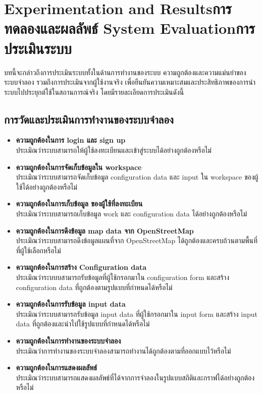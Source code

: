 \chapter{\ifproject%
\ifenglish Experimentation and Results\else การทดลองและผลลัพธ์\fi
\else%
\ifenglish System Evaluation\else การประเมินระบบ\fi
\fi}
\begin{mypara}
    \indent บทนี้จะกล่าวถึงการประเมินระบบทั้งในด้านการทำงานของระบบ ความถูกต้องและความแม่นยำของระบบจำลอง 
    รวมถึงการประเมินจากผู้ใช้งานจริง เพื่อยืนยันความเหมาะสมและประสิทธิภาพของการนำระบบไปประยุกต์ใช้ในสถานการณ์จริง
    โดยมีรายละเอียดการประเมินดังนี้
\end{mypara}

\section{การวัดและประเมินการทำงานของระบบจำลอง}
\begin{itemize}
    \item \textbf{ความถูกต้องในการ login และ sign up}
        \\ ประเมิณว่าระบบสามารถให้ผู้ใช้ลงทะเบียนและเข้าสู่ระบบได้อย่างถูกต้องหรือไม่
    \item \textbf{ความถูกต้องในการจัดเก็บข้อมูลใน workspace}
        \\ ประเมิณว่าระบบสามารถจัดเก็บข้อมูล configuration data และ input ใน workspace ของผู้ใช้ได้อย่างถูกต้องหรือไม่
    \item \textbf{ความถูกต้องในการเก็บข้อมูล ของผู้ใช้ที่ลงทะเบียน}
        \\ ประเมิณว่าระบบสามารถเก็บข้อมูล work และ configuration data ได้อย่างถูกต้องหรือไม่
    \item \textbf{ความถูกต้องในการดึงข้อมูล map data จาก OpenStreetMap}
        \\ ประเมิณว่าระบบสามารถดึงข้อมูลแผนที่จาก OpenStreetMap ได้ถูกต้องและครบถ้วนตามพื้นที่ที่ผู้ใช้เลือกหรือไม่
    \item \textbf{ความถูกต้องในการสร้าง Configuration data}
        \\ ประเมิณว่าระบบบสามารถรับข้อมูลที่ผู้ใช้กรอกมาใน configuration form และสร้าง configuration data ที่ถูกต้องตามรูปแบบที่กำหนดได้หรือไม่
    \item \textbf{ความถูกต้องในการรับข้อมูล input data}
        \\ ประเมิณว่าระบบสามารถรับข้อมูล input data ที่ผู้ใช้กรอกมาใน input form และสร้าง input data ที่ถูกต้องและนำไปใช้รูปแบบที่กำหนดได้หรือไม่
    \item \textbf{ความถูกต้องในการทำงานของระบบจำลอง}
        \\ ประเมิณว่าการทำงานของระบบจำลองสามารถทำงานได้ถูกต้องตามที่ออกแบบไว้หรือไม่
    \item \textbf{ความถูกต้องในการแสดงผลลัพธ์}
        \\ ประเมิณว่าระบบสามารถแสดงผลลัพธ์ที่ได้จากการจำลองในรูปแบบสถิติและกราฟได้อย่างถูกต้องหรือไม่

\end{itemize}
